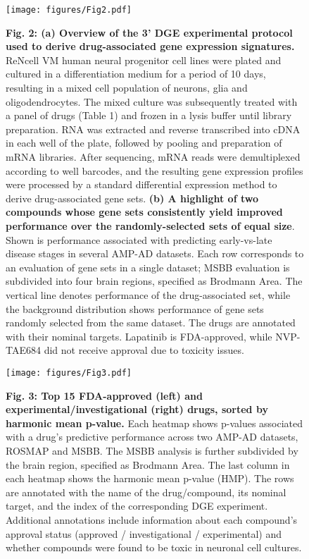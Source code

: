 \documentclass{article}
\begin{document}
\begin{figure}
  \texttt{[image: figures/Fig2.pdf]}
  \caption*{\textbf{Fig. 2: (a) Overview of the 3’ DGE experimental protocol used to derive drug-associated gene expression signatures.} ReNcell VM human neural progenitor cell lines were plated and cultured in a differentiation medium for a period of 10 days, resulting in a mixed cell population of neurons, glia and oligodendrocytes. The mixed culture was subsequently treated with a panel of drugs (Table 1) and frozen in a lysis buffer until library preparation. RNA was extracted and reverse transcribed into cDNA in each well of the plate, followed by pooling and preparation of mRNA libraries. After sequencing, mRNA reads were demultiplexed according to well barcodes, and the resulting gene expression profiles were processed by a standard differential expression method to derive drug-associated gene sets. \textbf{(b) A highlight of two compounds whose gene sets consistently yield improved performance over the randomly-selected sets of equal size}. Shown is performance associated with predicting early-vs-late disease stages in several AMP-AD datasets. Each row corresponds to an evaluation of gene sets in a single dataset; MSBB evaluation is subdivided into four brain regions, specified as Brodmann Area. The vertical line denotes performance of the drug-associated set, while the background distribution shows performance of gene sets randomly selected from the same dataset. The drugs are annotated with their nominal targets. Lapatinib is FDA-approved, while NVP-TAE684 did not receive approval due to toxicity issues.}
\end{figure}


\begin{landscape}
  \begin{figure}
    \begin{center}
      \texttt{[image: figures/Fig3.pdf]}
    \end{center}
    \caption*{\textbf{Fig. 3: Top 15 FDA-approved (left) and experimental/investigational (right) drugs, sorted by harmonic mean p-value.} Each heatmap shows p-values associated with a drug’s predictive performance across two AMP-AD datasets, ROSMAP and MSBB. The MSBB analysis is further subdivided by the brain region, specified as Brodmann Area. The last column in each heatmap shows the harmonic mean p-value (HMP). The rows are annotated with the name of the drug/compound, its nominal target, and the index of the corresponding DGE experiment. Additional annotations include information about each compound’s approval status (approved / investigational / experimental) and whether compounds were found to be toxic in neuronal cell cultures.}
\end{figure}
\end{landscape}
\end{document}
